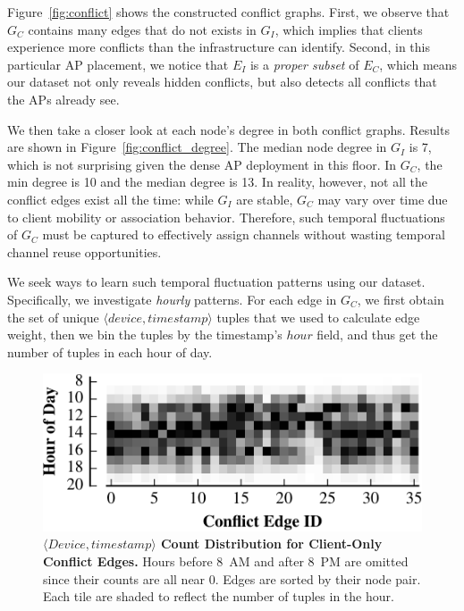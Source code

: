 Figure~\ref{fig:conflict} shows the constructed conflict graphs. First, we
observe that $G_C$ contains many edges that do not exists in $G_I$, which
implies that clients experience more conflicts than the infrastructure can
identify. Second, in this particular AP placement, we notice that $E_I$ is a
\textit{proper subset} of $E_C$, which means our dataset not only reveals hidden
conflicts, but also detects all conflicts that the APs already see.

We then take a closer look at each node's degree in both conflict graphs.
Results are shown in Figure~\ref{fig:conflict_degree}. The median node degree in
$G_I$ is 7, which is not surprising given the dense AP deployment in this floor.
In $G_C$, the min degree is 10 and the median degree is 13. In reality, however,
not all the conflict edges exist all the time: while $G_I$ are stable, $G_C$
may vary over time due to client mobility or association behavior. Therefore,
such temporal fluctuations of $G_C$ must be captured to effectively assign
channels without wasting temporal channel reuse opportunities.

We seek ways to learn such temporal fluctuation patterns using our dataset.
Specifically, we investigate \textit{hourly} patterns. For each edge in
$G_C$, we first obtain the set of unique $\langle device, timestamp \rangle$
tuples that we used to calculate edge weight, then we bin the tuples by the
timestamp's $hour$ field, and thus get the number of tuples in each hour of
day.

\begin{figure}[t]
  \centering
  \includegraphics[width=\columnwidth]{./figures/DavisConflictHour.pdf}
  \caption{\textbf{$\langle Device, timestamp \rangle$ Count Distribution for
      Client-Only Conflict Edges.} Hours before 8~AM and after 8~PM are omitted since their counts
    are all near 0. Edges are sorted by their node pair. Each tile are shaded to
    reflect the number of tuples in the hour.}
    \label{fig:conflict_hour}
  \vspace*{\aftercaptiongap}
\end{figure}

